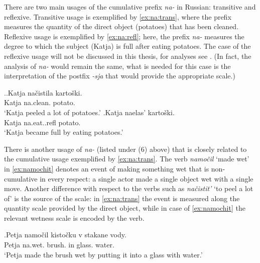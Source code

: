 There are two main usages of the cumulative prefix \textit{na-} in Russian: transitive and reflexive. Transitive usage is exemplified by \ref{ex:na:trans}, where the prefix measures the quantity of the direct object (potatoes) that has been cleaned. Reflexive usage is exemplified by \ref{ex:na:refl}; here, the prefix \textit{na-} measures the degree to which the subject (Katja) is full after eating potatoes. The case of the reflexive usage will not be discussed in this thesis, for analyses see \citet{KaganPereltsvaig:11a,KaganPereltsvaig:11b,Souchkova:04,Filip:00,Filip:05}. (In fact, the analysis of \textit{na-} would remain the same, what is needed for this case is the interpretation of the postfix \textit{-sja} that would provide the appropriate scale.)

\ex.\ag.\label{ex:na:trans}Katja na\v{c}istila karto\v{s}ki.\\
Katja na.clean. potato.\\
\trans `Katja peeled a lot of potatoes.'
\bg.\label{ex:na:refl}Katja naelas' karto\v{s}ki.\\
Katja na.eat..refl potato.\\
\trans `Katja became full by eating potatoes.'

There is another usage of \textit{na-} (listed under (6) above) that is closely related to the cumulative usage exemplified by \ref{ex:na:trans}. The verb \textit{namo\v{c}il} `made wet' in \ref{ex:namochit} denotes an event of making something wet that is non-cumulative in every respect: a single actor made a single object wet with a single move. Another difference with respect to the verbs such as \textit{na\v{c}istit'} `to peel a lot of' is the source of the scale: in \ref{ex:na:trans} the event is measured along the quantity scale provided by the direct object, while in case of \ref{ex:namochit} the relevant wetness scale is encoded by the verb.

\exg.\label{ex:namochit}Petja namo\v{c}il kisto\v{c}ku v stakane vody.\\
Petja na.wet. brush. in glass. water.\\
\trans `Petja made the brush wet by putting it into a glass with water.'

